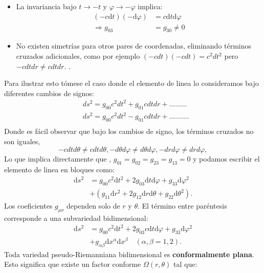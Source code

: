 \begin{itemize}
    \item La invariancia bajo $t \to -t$ y $\varphi \to -\varphi$ implica:
          \begin{align}
              (-c \mathrm{d}t)(-\mathrm{d}\varphi) & = c \mathrm{d}t \mathrm{d}\varphi \\
              \Rightarrow g_{03}                   & = g_{30} \neq 0
          \end{align}

    \item No existen simetrías para otros pares de coordenadas, eliminando términos cruzados adicionales, como por ejemplo $(-c d t)(-c d t)=c^2 d t^2$ pero $-c d t d r \neq c d t d r$.             .
\end{itemize}
Para ilustrar esto tómese el caso donde el elemento de linea lo consideramos bajo diferentes cambios de signos:
\begin{align*}
     & d s^2=g_{00} c^2 d t^2+g_{01} c d t d r+\ldots \ldots \ldots  \\
     & d s^2=g_{00} c^2 d t^2-g_{01} c d t d r+\ldots \ldots \ldots. \\
\end{align*}
Donde es fácil observar que bajo los cambios de signo, los términos cruzados no son iguales,
\[-c d t d \theta \neq c d t d \theta,-d \theta d \varphi \neq d \theta d \varphi,-d r d \varphi \neq d r d \varphi,\]
Lo que implica directamente que , $g_{01}=g_{02}=g_{23}=g_{13}=0$ y podamos escribir el elemento de linea  en bloques como:
\begin{align}
    \mathrm{d}s^2 & = g_{00} c^2 \mathrm{d}t^2 + 2 g_{03} \mathrm{d}t \mathrm{d}\varphi + g_{33} \mathrm{d}\varphi^2 \nonumber \\
                  & + \left(g_{11} \mathrm{d}r^2 + 2 g_{12} \mathrm{d}r \mathrm{d}\theta + g_{22} \mathrm{d}\theta^2\right).
\end{align}
Los coeficientes $g_{\mu\nu}$ dependen solo de $r$ y $\theta$. El término entre paréntesis corresponde a una subvariedad bidimensional:
\begin{align}
    \mathrm{d}s^2 & = g_{00} c^2 \mathrm{d}t^2 + 2 g_{03} c \mathrm{d}t \mathrm{d}\varphi + g_{33} \mathrm{d}\varphi^2 \nonumber \\
                  & + g_{\alpha\beta} \mathrm{d}x^\alpha \mathrm{d}x^\beta \quad (\alpha,\beta = 1,2).
\end{align}
Toda variedad pseudo-Riemanniana bidimensional es \textbf{conformalmente plana}. Esto significa que existe un factor conforme $\Omega(r,\theta)$ tal que:
